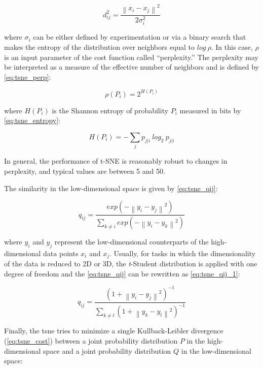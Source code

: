 \begin{equation}
\label{eq:tsne_dij}
d_{ij}^2 = \frac{\left\| x_i - x_j \right\|^2}{2\sigma_i^2}
\end{equation}

\noindent
where $\sigma_i$ can be either defined by experimentation or via a binary search that makes the entropy of the distribution over neighbors equal to $log\ \rho$. In this case, $\rho$ is an input parameter of the cost function called ``perplexity.'' The perplexity may be interpreted as a measure of the effective number of neighbors and is defined by \autoref{eq:tsne_perp}:

\begin{equation}
\label{eq:tsne_perp}
\rho(P_i) = 2^{H(P_i)}
\end{equation}

\noindent
where $H(P_i)$ is the Shannon entropy of probability $P_i$ measured in bits by \autoref{eq:tsne_entropy}:

\begin{equation}
\label{eq:tsne_entropy}
H(P_i) = -\sum_j p_{j|i}\ log_2\ p_{j|i}
\end{equation}

In general, the performance of t-SNE is reasonably robust to changes in perplexity, and typical values are between 5 and 50.

The similarity in the low-dimensional space is given by \autoref{eq:tsne_qij}:

\begin{equation}
\label{eq:tsne_qij}
q_{ij} = \frac{exp(-\left\| y_i - y_j \right\|^2)}{\sum_{k \neq i} exp(-\left\| y_i - y_k \right\|^2)}
\end{equation}

\noindent
where $y_i$ and $y_j$ represent the low-dimensional counterparts of the
high-dimensional data points $x_i$ and $x_j$. Usually, for tasks in which the dimensionality of the data is reduced to 2D or 3D, the \textit{t}-Student distribution is applied with one degree of freedom and the \autoref{eq:tsne_qij} can be rewritten as \autoref{eq:tsne_qij_1}:

\begin{equation}
\label{eq:tsne_qij_1}
q_{ij} = \frac{(1 +\left\| y_i - y_j \right\|^2)^{-1}}{\sum_{k \neq l} (1 +\left\| y_k - y_l \right\|^2)^{-1}}
\end{equation}

Finally, the \acs{tsne} tries to minimize a single Kullback-Leibler divergence (\autoref{eq:tsne_cost}) between a joint probability distribution $P$ in the high-dimensional space and a joint probability distribution $Q$ in the low-dimensional space:

